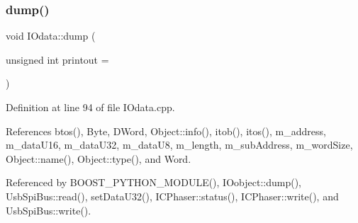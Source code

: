 \subsubsection{\texorpdfstring{dump()}{dump()}}
{\footnotesize\ttfamily void I\+Odata\+::dump (\begin{DoxyParamCaption}\item[{unsigned int}]{printout = {} }\end{DoxyParamCaption})}



Definition at line 94 of file I\+Odata.\+cpp.



References btos(), Byte, D\+Word, Object\+::info(), itob(), itos(), m\+\_\+address, m\+\_\+data\+U16, m\+\_\+data\+U32, m\+\_\+data\+U8, m\+\_\+length, m\+\_\+sub\+Address, m\+\_\+word\+Size, Object\+::name(), Object\+::type(), and Word.



Referenced by B\+O\+O\+S\+T\+\_\+\+P\+Y\+T\+H\+O\+N\+\_\+\+M\+O\+D\+U\+L\+E(), I\+Oobject\+::dump(), Usb\+Spi\+Bus\+::read(), set\+Data\+U32(), I\+C\+Phaser\+::status(), I\+C\+Phaser\+::write(), and Usb\+Spi\+Bus\+::write().


